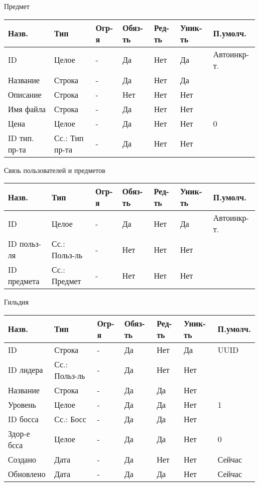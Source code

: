 \documentclass[../document.tex]{subfiles}
\begin{document}
Предмет

\begin{tabular}{ | l | l | l | l | l | l | l | }
  \hline
  Назв.         & Тип            & Огр-я & Обяз-ть & Ред-ть & Уник-ть & П.умолч.    \\
  \hline
  ID            & Целое          & -     & Да      & Нет    & Да      & Автоинкр-т. \\
  Название      & Строка         & -     & Да      & Нет    & Да      &             \\
  Описание      & Строка         & -     & Нет     & Нет    & Нет     &             \\
  Имя файла     & Строка         & -     & Да      & Нет    & Нет     &             \\
  Цена          & Целое          & -     & Да      & Нет    & Нет     & 0           \\
  ID тип. пр-та & Сс.: Тип пр-та & -     & Да      & Нет    & Нет     &             \\
  \hline
\end{tabular}

Связь пользователей и предметов

\begin{tabular}{ | l | l | l | l | l | l | l | }
  \hline
  Назв.       & Тип           & Огр-я & Обяз-ть & Ред-ть & Уник-ть & П.умолч.    \\
  \hline
  ID          & Целое         & -     & Да      & Нет    & Да      & Автоинкр-т. \\
  ID польз-ля & Сс.: Польз-ль & -     & Нет     & Нет    & Нет     &             \\
  ID предмета & Сс.: Предмет  & -     & Нет     & Нет    & Нет     &             \\
  \hline
\end{tabular}

Гильдия

\begin{tabular}{ | l | l | l | l | l | l | l | }
  \hline
  Назв.       & Тип           & Огр-я & Обяз-ть & Ред-ть & Уник-ть & П.умолч. \\
  \hline
  ID          & Строка        & -     & Да      & Нет    & Да      & UUID     \\
  ID лидера   & Сс.: Польз-ль & -     & Да      & Нет    & Нет     &          \\
  Название    & Строка        & -     & Да      & Да     & Нет     &          \\
  Уровень     & Целое         & -     & Да      & Да     & Нет     & 1        \\
  ID босса    & Сс.: Босс     & -     & Да      & Да     & Нет     &          \\
  Здор-е бсса & Целое         & -     & Да      & Да     & Нет     & 0        \\
  Создано     & Дата          & -     & Да      & Нет    & Нет     & Сейчас   \\
  Обновлено   & Дата          & -     & Да      & Да     & Нет     & Сейчас   \\
  \hline
\end{tabular}
\end{document}
